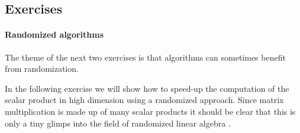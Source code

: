 \subsection*{Exercises \thesection}







\paragraph*{Randomized algorithms} The theme of the
next two exercises is that algorithms can sometimes benefit from randomization.



In the following exercise we will show how to speed-up the computation of the
scalar product in high dimension using a randomized approach.
Since matrix multiplication is made up of many scalar products it should be
clear that this is only a tiny glimps into the field of randomized
linear algebra \citep[e.g.][]{murrayRandomizedNumericalLinear2023}.



